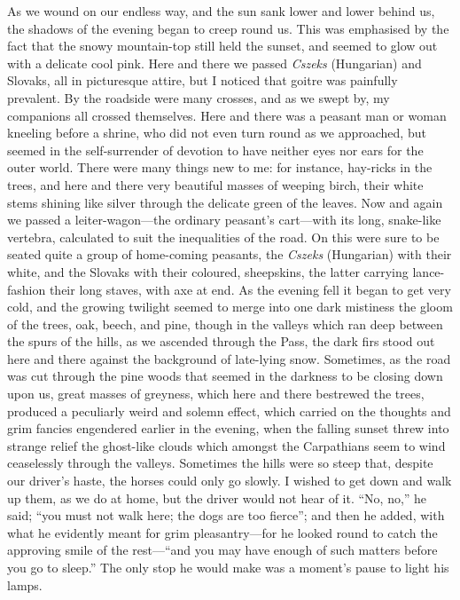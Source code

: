 \documentclass{article}
\begin{document}
				As we wound on our endless way, and the sun sank lower and lower behind us, the shadows of the evening began to creep round us. This was emphasised by the fact that the snowy mountain-top still held the sunset, and seemed to glow out with a delicate cool pink. Here and there we passed \textit{Cszeks} (Hungarian) and Slovaks, all in picturesque attire, but I noticed that goitre was painfully prevalent. By the roadside were many crosses, and as we swept by, my companions all crossed themselves. Here and there was a peasant man or woman kneeling before a shrine, who did not even turn round as we approached, but seemed in the self-surrender of devotion to have neither eyes nor ears for the outer world. There were many things new to me: for instance, hay-ricks in the trees, and here and there very beautiful masses of weeping birch, their white stems shining like silver through the delicate green of the leaves. Now and again we passed a leiter-wagon—the ordinary peasant’s cart—with its long, snake-like vertebra, calculated to suit the inequalities of the road. On this were sure to be seated quite a group of home-coming peasants, the \textit{Cszeks} (Hungarian) with their white, and the Slovaks with their coloured, sheepskins, the latter carrying lance-fashion their long staves, with axe at end. As the evening fell it began to get very cold, and the growing twilight seemed to merge into one dark mistiness the gloom of the trees, oak, beech, and pine, though in the valleys which ran deep between the spurs of the hills, as we ascended through the Pass, the dark firs stood out here and there against the background of late-lying snow. Sometimes, as the road was cut through the pine woods that seemed in the darkness to be closing down upon us, great masses of greyness, which here and there bestrewed the trees, produced a peculiarly weird and solemn effect, which carried on the thoughts and grim fancies engendered earlier in the evening, when the falling sunset threw into strange relief the ghost-like clouds which amongst the Carpathians seem to wind ceaselessly through the valleys. Sometimes the hills were so steep that, despite our driver’s haste, the horses could only go slowly. I wished to get down and walk up them, as we do at home, but the driver would not hear of it. “No, no,” he said; “you must not walk here; the dogs are too fierce”; and then he added, with what he evidently meant for grim pleasantry—for he looked round to catch the approving smile of the rest—“and you may have enough of such matters before you go to sleep.” The only stop he would make was a moment’s pause to light his lamps.\par\bigskip
				
\end{document}
